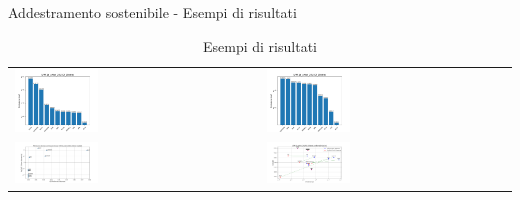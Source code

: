 \begin{frame}{Addestramento sostenibile - Esempi di risultati}
    \begin{table}[H]
        \centering
        \setlength\tabcolsep{20pt} %
        \setlength{\arrayrulewidth}{0.5pt}
        \begin{tabularx}{\textwidth}{X X}
            \includegraphics[width=0.35\textwidth, height=0.35\textheight, trim=0 0 0 0]{images/emissions_LFM-1b_artist_20U50I_25strat_earlyClassic.png} &
            \includegraphics[width=0.35\textwidth, height=0.35\textheight, trim=0 0 0 0]{images/emissions_LFM-1b_artist_20U50I_25strat_earlyModified.png} \\
            \includegraphics[width=0.35\textwidth, height=0.35\textheight, trim=0 0 0 0]{images/decrement_recall@10_LFM-1b_artist_20U50I_25strat.png} &
            \includegraphics[width=0.35\textwidth, height=0.35\textheight, trim=0 0 0 0]{images/recall@10_LFM-1b_artist_20U50I_25strat_comparison.png} \\
        \end{tabularx}
        \caption{Esempi di risultati}
    \end{table}
\end{frame}


